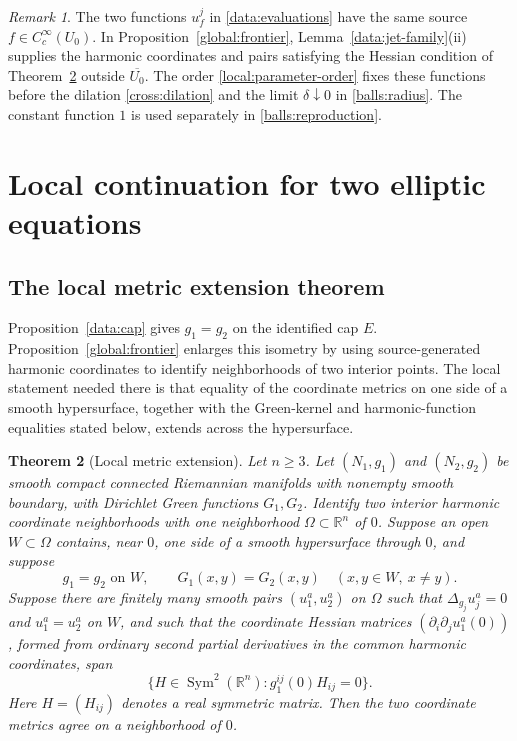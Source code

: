 \documentclass[11pt,a4paper]{article}
\newtheorem{theorem}{Theorem}[section]
\theoremstyle{definition}
\theoremstyle{remark}
\newtheorem{remark}[theorem]{Remark}
\numberwithin{equation}{section}
\begin{document}
\begin{remark}\label{data:local-pairs}
The two functions $u_f^j$ in \eqref{data:evaluations} have the
same source $f\in C_c^\infty(U_0)$. In Proposition~\ref{global:frontier},
Lemma~\ref{data:jet-family}(ii) supplies the harmonic coordinates
and pairs satisfying the Hessian condition of Theorem~\ref{local:extension}
outside $\overline{U_0}$. The order \eqref{local:parameter-order}
fixes these functions before the dilation \eqref{cross:dilation}
and the limit $\delta\downarrow0$ in \eqref{balls:radius}.
The constant function $1$ is used separately in \eqref{balls:reproduction}.
\end{remark}
\section{Local continuation for two elliptic equations}
\label{cross:section}

\subsection{The local metric extension theorem}

Proposition~\ref{data:cap} gives $g_1=g_2$ on the identified cap
$E$. Proposition~\ref{global:frontier} enlarges this isometry by using
source-generated harmonic coordinates to identify neighborhoods of
two interior points. The local statement needed there is that
equality of the coordinate metrics on one side of a smooth
hypersurface, together with the Green-kernel and harmonic-function
equalities stated below, extends across the hypersurface.

\begin{theorem}[Local metric extension]\label{local:extension}
Let $n\geq3$.  Let $(N_1,g_1)$ and $(N_2,g_2)$ be smooth compact
connected Riemannian manifolds with nonempty smooth boundary, with
Dirichlet Green functions $G_1,G_2$.  Identify two interior harmonic
coordinate neighborhoods with one neighborhood $\Omega\subset
\mathbb R^n$ of $0$.  Suppose an open $W\subset\Omega$ contains, near
$0$, one side of a smooth hypersurface through $0$, and suppose
\[
 g_1=g_2\text{ on }W,\qquad
 G_1(x,y)=G_2(x,y)\quad(x,y\in W,\ x\ne y).
\]
Suppose there are finitely many smooth pairs $(u_1^a,u_2^a)$ on
$\Omega$ such that $\Delta_{g_j}u_j^a=0$ and $u_1^a=u_2^a$ on $W$,
and such that the coordinate Hessian matrices
$(\partial_i\partial_j u_1^a(0))$, formed from ordinary second
partial derivatives in the common harmonic coordinates, span
\[
 \{H\in\operatorname{Sym}^2(\mathbb R^n):g_1^{ij}(0)H_{ij}=0\}.
\]
Here $H=(H_{ij})$ denotes a real symmetric matrix.
Then the two coordinate metrics agree on a neighborhood of $0$.
\end{theorem}
\end{document}
